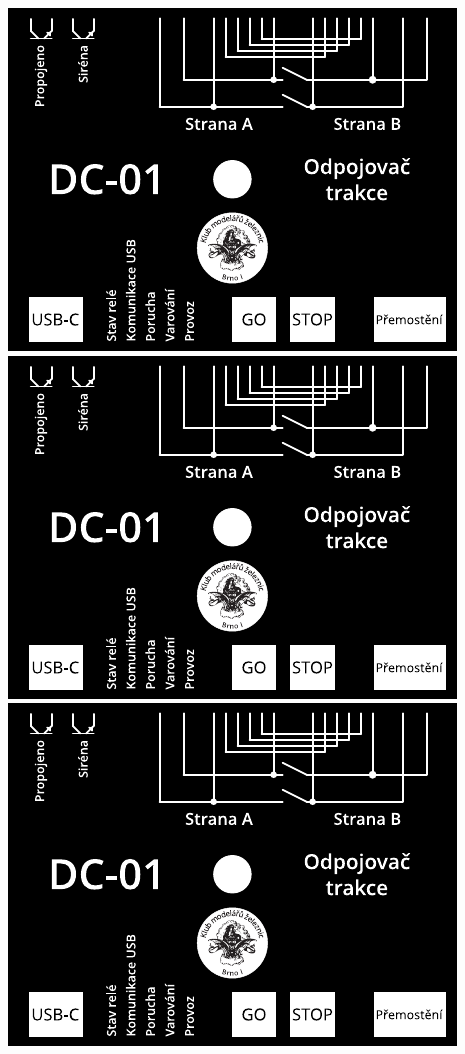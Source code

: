 \documentclass[12pt,a4paper,landscape]{article}
\begin{document}
\includegraphics{single.pdf} \hspace{1em}
\includegraphics{single.pdf} \hspace{1em}
\includegraphics{single.pdf}
\end{document}
